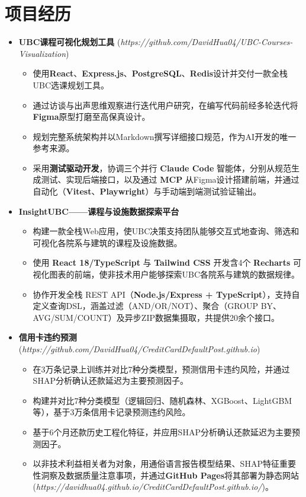 \documentclass{resume}
\begin{document}
\section{项目经历}
\begin{itemize}[parsep=0.2ex]
  \item \textbf{UBC课程可视化规划工具} (\textit{https://github.com/DavidHua04/UBC-Courses-Visualization})
  \begin{itemize}
    \item 使用\textbf{React}、\textbf{Express.js}、\textbf{PostgreSQL}、\textbf{Redis}设计并交付一款全栈UBC选课规划工具。
    \item 通过访谈与出声思维观察进行迭代用户研究，在编写代码前经多轮迭代将\textbf{Figma}原型打磨至高保真设计。
    \item 规划完整系统架构并以Markdown撰写详细接口规范，作为AI开发的唯一参考来源。
    \item 采用\textbf{测试驱动开发}，协调三个并行 \textbf{Claude Code} 智能体，分别从规范生成测试、实现后端接口，以及通过 \textbf{MCP} 从Figma设计搭建前端，并通过自动化（\textbf{Vitest}、\textbf{Playwright}）与手动端到端测试验证输出。
  \end{itemize}
  \item \textbf{InsightUBC——课程与设施数据探索平台}
  \begin{itemize}
    \item 构建一款全栈Web应用，使UBC决策支持团队能够交互式地查询、筛选和可视化各院系与建筑的课程及设施数据。
    \item 使用 \textbf{React 18/TypeScript} 与 \textbf{Tailwind CSS} 开发含4个 \textbf{Recharts} 可视化图表的前端，使非技术用户能够探索UBC各院系与建筑的数据规律。
    \item 协作开发全栈 REST API（\textbf{Node.js/Express + TypeScript}），支持自定义查询DSL，涵盖过滤（AND/OR/NOT）、聚合（GROUP BY、AVG/SUM/COUNT）及异步ZIP数据集摄取，共提供20余个接口。
  \end{itemize}
  \item \textbf{信用卡违约预测} (\textit{https://github.com/DavidHua04/CreditCardDefaultPost.github.io})
  \begin{itemize}
    \item 在3万条记录上训练并对比7种分类模型，预测信用卡违约风险，并通过SHAP分析确认还款延迟为主要预测因子。
    \item 构建并对比7种分类模型（逻辑回归、随机森林、XGBoost、LightGBM等），基于3万条信用卡记录预测违约风险。
    \item 基于6个月还款历史工程化特征，并应用SHAP分析确认还款延迟为主要预测因子。
    \item 以非技术利益相关者为对象，用通俗语言报告模型结果、SHAP特征重要性洞察及数据质量注意事项，并通过\textbf{GitHub Pages}将其部署为静态网站 (\textit{https://davidhua04.github.io/CreditCardDefaultPost.github.io/})。
  \end{itemize}
\end{itemize}
\end{document}

